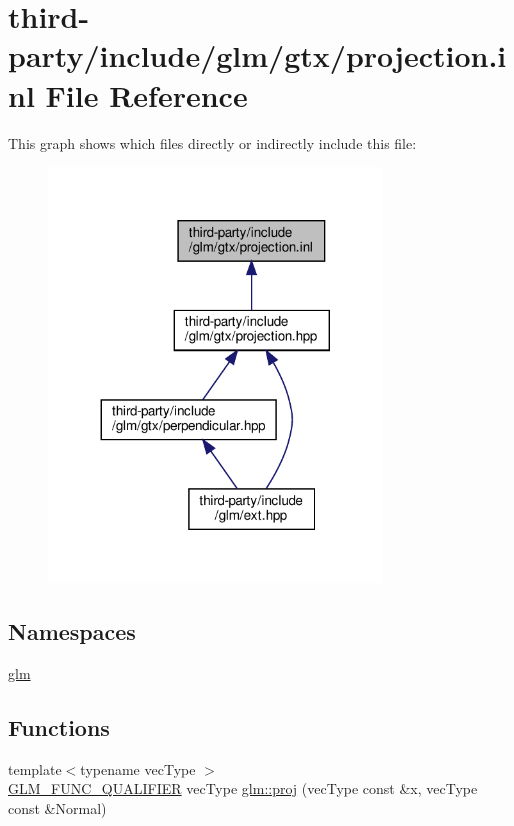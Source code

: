 \hypertarget{projection_8inl}{}\section{third-\/party/include/glm/gtx/projection.inl File Reference}
\label{projection_8inl}
This graph shows which files directly or indirectly include this file\+:
\nopagebreak
\begin{figure}[H]
\begin{center}
\leavevmode
\includegraphics[width=251pt]{projection_8inl__dep__incl}
\end{center}
\end{figure}
\subsection*{Namespaces}
\begin{DoxyCompactItemize}
\item 
 \hyperlink{namespaceglm}{glm}
\end{DoxyCompactItemize}
\subsection*{Functions}
\begin{DoxyCompactItemize}
\item 
{\footnotesize template$<$typename vec\+Type $>$ }\\\hyperlink{setup_8hpp_a33fdea6f91c5f834105f7415e2a64407}{G\+L\+M\+\_\+\+F\+U\+N\+C\+\_\+\+Q\+U\+A\+L\+I\+F\+I\+ER} vec\+Type \hyperlink{group__gtx__projection_gadf29123bcf748fc9d6fb0998192184cf}{glm\+::proj} (vec\+Type const \&x, vec\+Type const \&Normal)
\end{DoxyCompactItemize}
